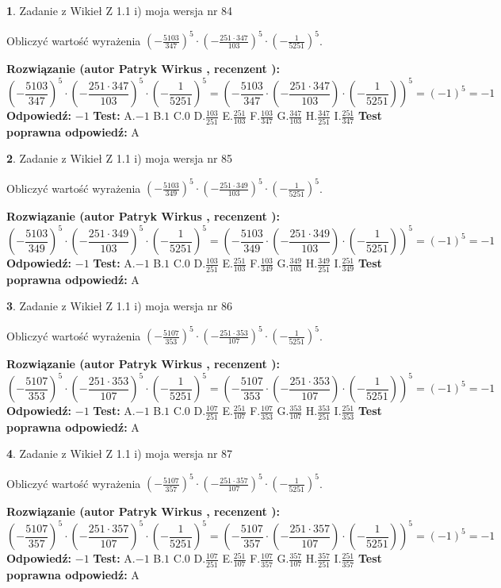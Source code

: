 \documentclass[12pt, a4paper]{article}
\theoremstyle{definition} %
\newtheorem{zad}{}
\newcommand{\zadStart}[1]{\begin{zad}#1\newline}
\newcommand{\zadStop}{\end{zad}}
\newcommand{\rozwStart}[2]{\noindent \textbf{Rozwiązanie (autor #1 , recenzent #2): }\newline}
\newcommand{\rozwStop}{\newline}
\newcommand{\odpStart}{\noindent \textbf{Odpowiedź:}\newline}
\newcommand{\odpStop}{\newline}
\newcommand{\testStart}{\noindent \textbf{Test:}\newline}
\newcommand{\testStop}{\newline}
\newcommand{\kluczStart}{\noindent \textbf{Test poprawna odpowiedź:}\newline}
\newcommand{\kluczStop}{\newline}
\begin{document}
\zadStart{Zadanie z Wikieł Z 1.1 i) moja wersja nr 84}

Obliczyć wartość wyrażenia $(-\frac{5103}{347})^{5} \cdot (-\frac{251 \cdot 347}{103})^{5} \cdot (-\frac{1}{5251})^{5}$.
\zadStop
\rozwStart{Patryk Wirkus}{}
$$(-\frac{5103}{347})^{5} \cdot (-\frac{251 \cdot 347}{103})^{5} \cdot (-\frac{1}{5251})^{5} = (-\frac{5103}{347} \cdot (-\frac{251 \cdot 347}{103}) \cdot (-\frac{1}{5251}))^{5} = (-1)^{5} = -1$$
\rozwStop
\odpStart
$-1$
\odpStop
\testStart
A.$-1$ B.$1$ C.$0$ D.$\frac{103}{251}$ E.$\frac{251}{103}$
F.$\frac{103}{347}$ G.$\frac{347}{103}$
H.$\frac{347}{251}$
I.$\frac{251}{347}$
\testStop
\kluczStart
A
\kluczStop



\zadStart{Zadanie z Wikieł Z 1.1 i) moja wersja nr 85}

Obliczyć wartość wyrażenia $(-\frac{5103}{349})^{5} \cdot (-\frac{251 \cdot 349}{103})^{5} \cdot (-\frac{1}{5251})^{5}$.
\zadStop
\rozwStart{Patryk Wirkus}{}
$$(-\frac{5103}{349})^{5} \cdot (-\frac{251 \cdot 349}{103})^{5} \cdot (-\frac{1}{5251})^{5} = (-\frac{5103}{349} \cdot (-\frac{251 \cdot 349}{103}) \cdot (-\frac{1}{5251}))^{5} = (-1)^{5} = -1$$
\rozwStop
\odpStart
$-1$
\odpStop
\testStart
A.$-1$ B.$1$ C.$0$ D.$\frac{103}{251}$ E.$\frac{251}{103}$
F.$\frac{103}{349}$ G.$\frac{349}{103}$
H.$\frac{349}{251}$
I.$\frac{251}{349}$
\testStop
\kluczStart
A
\kluczStop



\zadStart{Zadanie z Wikieł Z 1.1 i) moja wersja nr 86}

Obliczyć wartość wyrażenia $(-\frac{5107}{353})^{5} \cdot (-\frac{251 \cdot 353}{107})^{5} \cdot (-\frac{1}{5251})^{5}$.
\zadStop
\rozwStart{Patryk Wirkus}{}
$$(-\frac{5107}{353})^{5} \cdot (-\frac{251 \cdot 353}{107})^{5} \cdot (-\frac{1}{5251})^{5} = (-\frac{5107}{353} \cdot (-\frac{251 \cdot 353}{107}) \cdot (-\frac{1}{5251}))^{5} = (-1)^{5} = -1$$
\rozwStop
\odpStart
$-1$
\odpStop
\testStart
A.$-1$ B.$1$ C.$0$ D.$\frac{107}{251}$ E.$\frac{251}{107}$
F.$\frac{107}{353}$ G.$\frac{353}{107}$
H.$\frac{353}{251}$
I.$\frac{251}{353}$
\testStop
\kluczStart
A
\kluczStop



\zadStart{Zadanie z Wikieł Z 1.1 i) moja wersja nr 87}

Obliczyć wartość wyrażenia $(-\frac{5107}{357})^{5} \cdot (-\frac{251 \cdot 357}{107})^{5} \cdot (-\frac{1}{5251})^{5}$.
\zadStop
\rozwStart{Patryk Wirkus}{}
$$(-\frac{5107}{357})^{5} \cdot (-\frac{251 \cdot 357}{107})^{5} \cdot (-\frac{1}{5251})^{5} = (-\frac{5107}{357} \cdot (-\frac{251 \cdot 357}{107}) \cdot (-\frac{1}{5251}))^{5} = (-1)^{5} = -1$$
\rozwStop
\odpStart
$-1$
\odpStop
\testStart
A.$-1$ B.$1$ C.$0$ D.$\frac{107}{251}$ E.$\frac{251}{107}$
F.$\frac{107}{357}$ G.$\frac{357}{107}$
H.$\frac{357}{251}$
I.$\frac{251}{357}$
\testStop
\kluczStart
A
\kluczStop
\end{document}
